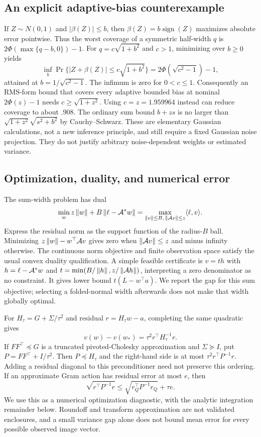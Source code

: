 \subsection{An explicit adaptive-bias counterexample}
If $Z\sim N(0,1)$ and $|\beta(Z)|\le b$, then
$\beta(Z)=b\operatorname{sign}(Z)$ maximizes absolute error pointwise.
Thus the worst coverage of a symmetric half-width $q$ is
$2\Phi(\max\{q-b,0\})-1$. For $q=c\sqrt{1+b^2}$ and $c>1$,
minimizing over $b\ge0$ yields
\[
\inf_b\Pr\{|Z+\beta(Z)|\le c\sqrt{1+b^2}\}
=2\Phi(\sqrt{c^2-1})-1,
\]
attained at $b=1/\sqrt{c^2-1}$. The infimum is zero for $0<c\le1$.
Consequently an RMS-form bound that covers every adaptive bounded bias
at nominal $2\Phi(z)-1$ needs $c\ge\sqrt{1+z^2}$. Using $c=z=1.959964$
instead can reduce coverage to about .908. The ordinary sum bound
$b+zs$ is no larger than $\sqrt{1+z^2}\sqrt{s^2+b^2}$ by
Cauchy--Schwarz. These are elementary Gaussian calculations, not a new
inference principle, and still require a fixed Gaussian noise projection.
They do not justify arbitrary noise-dependent weights or estimated variance.

\subsection{Optimization, duality, and numerical error}
The sum-width problem has dual
\begin{equation}
\min_w z\left\|w\right\|+B\left\|\ell-\mathcal A^*w\right\|
=\max_{\left\|v\right\|\le B,\,\left\|\mathcal A v\right\|\le z}\langle \ell,v\rangle.
\end{equation}
Express the residual norm as the support function of the radius-$B$ ball.
Minimizing $z\left\|w\right\|-w^\top\mathcal A v$ gives zero when $\left\|\mathcal A v\right\|\le z$
and minus infinity otherwise. The continuous norm objective and finite
observation space satisfy the usual convex duality qualification. A simple
feasible certificate is $v=th$ with $h=\ell-\mathcal A^*w$ and
$t=\min(B/\left\|h\right\|,z/\left\|\mathcal A h\right\|)$, interpreting a zero denominator as
no constraint. It gives lower bound $t(L-w^\top a)$. We report the gap for
this sum objective; selecting a folded-normal width afterwards does not
make that width globally optimal.

For $H_\tau=G+\Sigma/\tau^2$ and residual $r=H_\tau w-a$, completing the
same quadratic gives
\begin{equation}\label{eq:solvegap}
v(w)-v(w_*)=\tau^2r^\top H_\tau^{-1}r.
\end{equation}
If $FF^\top\preceq G$ is a truncated pivoted-Cholesky approximation and
$\Sigma\succeq I$, put $P=FF^\top+I/\tau^2$. Then
$P\preceq H_\tau$ and the right-hand side is at most
$\tau^2r^\top P^{-1}r$. Adding a residual diagonal to this preconditioner
need not preserve this ordering. If an approximate Gram action has residual
error at most $e$, then
\[
\sqrt{r^\top P^{-1}r}\le
\sqrt{r_Q^\top P^{-1}r_Q}+\tau e.
\]
We use this as a numerical optimization diagnostic, with the analytic
integration remainder below. Roundoff and transform approximation are not
validated enclosures, and a small variance gap alone does not bound mean
error for every possible observed image vector.

